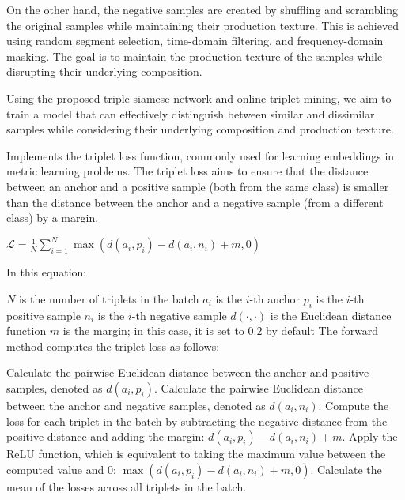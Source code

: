On the other hand, the negative samples are created by shuffling and scrambling the original samples while maintaining their production texture. This is achieved using random segment selection, time-domain filtering, and frequency-domain masking. The goal is to maintain the production texture of the samples while disrupting their underlying composition.

Using the proposed triple siamese network and online triplet mining, we aim to train a model that can effectively distinguish between similar and dissimilar samples while considering their underlying composition and production texture.

 Implements the triplet loss function, commonly used for learning embeddings in metric learning problems. The triplet loss aims to ensure that the distance between an anchor and a positive sample (both from the same class) is smaller than the distance between the anchor and a negative sample (from a different class) by a margin.

$\mathcal{L} = \frac{1}{N}\sum_{i=1}^{N} \max \left( d\left(a_i, p_i\right) - d\left(a_i, n_i\right) + m, 0 \right)$

In this equation:

$N$ is the number of triplets in the batch
$a_i$ is the $i$-th anchor
$p_i$ is the $i$-th positive sample
$n_i$ is the $i$-th negative sample
$d(\cdot, \cdot)$ is the Euclidean distance function
$m$ is the margin; in this case, it is set to 0.2 by default
The forward method computes the triplet loss as follows:

Calculate the pairwise Euclidean distance between the anchor and positive samples, denoted as $d(a_i, p_i)$.
Calculate the pairwise Euclidean distance between the anchor and negative samples, denoted as $d(a_i, n_i)$.
Compute the loss for each triplet in the batch by subtracting the negative distance from the positive distance and adding the margin: $d(a_i, p_i) - d(a_i, n_i) + m$.
Apply the ReLU function, which is equivalent to taking the maximum value between the computed value and 0: $\max \left( d(a_i, p_i) - d(a_i, n_i) + m, 0 \right)$.
Calculate the mean of the losses across all triplets in the batch.